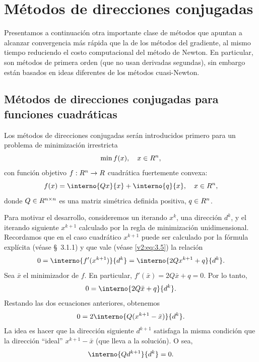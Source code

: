 
\section{Métodos de direcciones conjugadas}\label{v2:sec:3.4}

Presentamos a continuación otra importante clase de métodos que apuntan a alcanzar convergencia más rápida que la de los métodos del gradiente, al mismo tiempo reduciendo el costo computacional del método de Newton. En particular, son métodos de primera orden (que no usan derivadas segundas), sin embargo están basados en ideas diferentes de los métodos cuasi-Newton.

\subsection{Métodos de direcciones conjugadas para funciones cuadráticas}\label{v2:sec:3.4.1}

Los métodos de direcciones conjugadas serán introducidos primero para un problema de minimización irrestricta
\begin{equation}
    \min f(x), \quad x \in R^n,
    \label{v2:eq:3.126}
\end{equation}
con función objetivo $f : R^n \to R$ cuadrática fuertemente convexa:
\begin{equation}
    f(x) = \interno{Qx}{x} + \interno{q}{x}, \quad x \in \Rn,
    \label{v2:eq:3.127}
\end{equation}
donde $Q \in R^{n \times n}$ es una matriz simétrica definida positiva, $q \in R^n$.

Para motivar el desarrollo, consideremos un iterando $x^k$, una dirección $d^k$, y el iterando siguiente $x^{k+1}$ calculado por la regla de minimización unidimensional. Recordamos que en el caso cuadrático $x^{k+1}$ puede ser calculado por la fórmula explícita (véase \S~3.1.1) y que vale (véase \eqref{v2:eq:3.5}) la relación
\[
    0 = \interno{f'(x^{k+1})}{d^k} = \interno{2Qx^{k+1} + q}{d^k}.
\]
Sea $\bar{x}$ el minimizador de $f$. En particular, $f'(\bar{x}) = 2Q\bar{x} + q = 0$. Por lo tanto,
\[
    0 = \interno{2Q\bar{x} + q}{d^k}.
\]
Restando las dos ecuaciones anteriores, obtenemos
\[
    0 = 2\interno{Q(x^{k+1} - \bar{x})}{d^k}.
\]
La idea es hacer que la dirección siguiente $d^{k+1}$ satisfaga la misma condición que la dirección ``ideal'' $x^{k+1} - \bar{x}$ (que lleva a la solución). O sea,
\[
    \interno{Qd^{k+1}}{d^k} = 0.
\]

